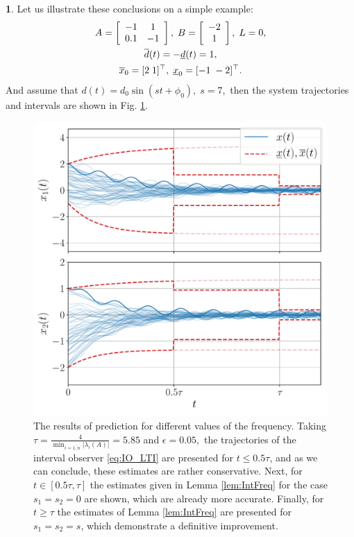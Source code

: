 \documentclass[letterpaper, 10 pt, conference]{ieeeconf}
\theoremstyle{plain}
\theoremstyle{definition}
\newtheorem*{example*}{\protect\examplename}
\theoremstyle{plain}
\theoremstyle{plain}
\theoremstyle{remark}
\providecommand{\examplename}{Example}
\begin{document}
\begin{example*}
Let us illustrate these conclusions on a simple example:
\begin{gather*}
A=\left[\begin{array}{cc}
-1 & 1\\
0.1 & -1
\end{array}\right],\;B=\left[\begin{array}{c}
-2\\
1
\end{array}\right],\;L=0,\\
\overline{d}(t)=-\underline{d}(t)=1,\\
\overline{x}_{0}=[2\;1]^{\top},\;\underline{x}_{0}=[-1\;-2]^{\top}.
\end{gather*}
And assume that
$
d(t)=d_0\sin(st+\phi_0),\;s=7,
$
then the system trajectories and intervals are shown in Fig. \ref{fig:IntFreq}. 
\begin{figure}
\begin{centering}
\includegraphics[width=\linewidth]{asymptotic}
\par\end{centering}
\caption{\label{fig:IntFreq} The results of prediction for different values
of the frequency. Taking $\tau=\frac{4}{\min_{i=\overline{1,n}}|\lambda_{i}(A)|}=5.85$ and $\epsilon=0.05,$ the trajectories of the interval observer \eqref{eq:IO_LTI} are presented for $t\leq0.5\tau$, and as we can conclude, these estimates are rather conservative. Next, for $t\in[0.5\tau,\tau]$ the estimates given in Lemma \ref{lem:IntFreq} for the case $s_{1}=s_{2}=0$ are shown, which are already more accurate. Finally, for $t\geq\tau$ the estimates of Lemma \ref{lem:IntFreq} are presented for $s_{1}=s_{2}=s$, which demonstrate a definitive improvement. }
\end{figure}
\end{example*}
\end{document}
